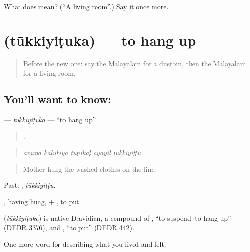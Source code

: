 \begin{tcolorbox}[breakable,colback=teal!4,colframe=teal!35!black,title={Before you move on}]
What does  mean? (\textquotedblleft{}A living room\textquotedblright{}.) Say it once more.
\end{tcolorbox}
\section[\texorpdfstring{\ml{തൂക്കിയിടുക} (tūkkiyiṭuka)}{തൂക്കിയിടുക (tūkkiyiṭuka)}]{ (tūkkiyiṭuka) — to hang up}

\label{lesson:ML-C571-tukkiyituka}



\begin{quote}
Before the new one: say the Malayalam for a dustbin, then the Malayalam for a living room.
\end{quote}

\subsection*{You'll want to know: }
\textbf{} — \emph{tūkkiyiṭuka} — \textquotedblleft{}to hang up\textquotedblright{}.

\begin{quote}
    .
\end{quote}

\begin{quote}
\emph{amma kaḻukiya tuṇikaḷ ayayil tūkkiyiṭṭu.}
\end{quote}

\begin{quote}
Mother hung the washed clothes on the line.
\end{quote}

Past: , \emph{tūkkiyiṭṭu}.

, having hung, + , to put.

\begin{cousinweb}
\textbf{} (\emph{tūkkiyiṭuka}) is native Dravidian, a compound of , \textquotedblleft{}to suspend, to hang up\textquotedblright{} (DEDR 3376), and , \textquotedblleft{}to put\textquotedblright{} (DEDR 442).
\end{cousinweb}

\begin{grammarlens}[title={What you've built}]
One more word for describing what you lived and felt.
\end{grammarlens}


